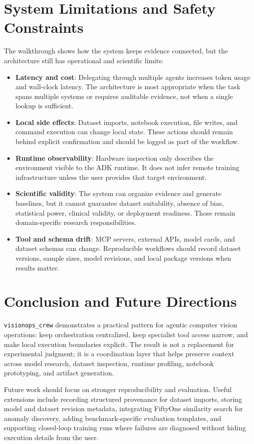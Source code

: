 \documentclass[11pt,a4paper]{article}
\begin{document}
\section{System Limitations and Safety Constraints}
The walkthrough shows how the system keeps evidence connected, but the architecture still has operational and scientific limits:
\begin{itemize}
    \item \textbf{Latency and cost}: Delegating through multiple agents increases token usage and wall-clock latency. The architecture is most appropriate when the task spans multiple systems or requires auditable evidence, not when a single lookup is sufficient.
    \item \textbf{Local side effects}: Dataset imports, notebook execution, file writes, and command execution can change local state. These actions should remain behind explicit confirmation and should be logged as part of the workflow.
    \item \textbf{Runtime observability}: Hardware inspection only describes the environment visible to the ADK runtime. It does not infer remote training infrastructure unless the user provides that target environment.
    \item \textbf{Scientific validity}: The system can organize evidence and generate baselines, but it cannot guarantee dataset suitability, absence of bias, statistical power, clinical validity, or deployment readiness. Those remain domain-specific research responsibilities.
    \item \textbf{Tool and schema drift}: MCP servers, external APIs, model cards, and dataset schemas can change. Reproducible workflows should record dataset versions, sample sizes, model revisions, and local package versions when results matter.
\end{itemize}

\section{Conclusion and Future Directions}
\texttt{visionops\_crew} demonstrates a practical pattern for agentic computer vision operations: keep orchestration centralized, keep specialist tool access narrow, and make local execution boundaries explicit. The result is not a replacement for experimental judgment; it is a coordination layer that helps preserve context across model research, dataset inspection, runtime profiling, notebook prototyping, and artifact generation.

Future work should focus on stronger reproducibility and evaluation. Useful extensions include recording structured provenance for dataset imports, storing model and dataset revision metadata, integrating FiftyOne similarity search for anomaly discovery, adding benchmark-specific evaluation templates, and supporting closed-loop training runs where failures are diagnosed without hiding execution details from the user.
\end{document}
